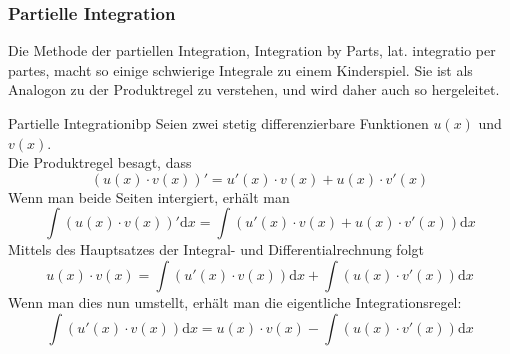 %
%
\subsubsection{Partielle Integration}
Die Methode der partiellen Integration, Integration by Parts, lat. integratio per partes, macht so einige schwierige Integrale zu einem Kinderspiel. Sie ist als Analogon zu der Produktregel zu verstehen, und wird daher auch so hergeleitet.
\begin{satz}{Partielle Integration}{ibp}
Seien zwei stetig differenzierbare Funktionen $u(x)$ und $v(x)$. \\
Die Produktregel besagt, dass
$$( u(x) \cdot v(x) )' = u'(x) \cdot v(x) + u(x) \cdot v'(x)$$ 
Wenn man beide Seiten intergiert, erhält man 
$$\int ( u(x) \cdot v(x) )' \mathrm{d}x = \int ( u'(x) \cdot v(x) + u(x) \cdot v'(x) ) \mathrm{d}x$$ 
Mittels des Hauptsatzes der Integral- und Differentialrechnung folgt
$$u(x) \cdot v(x) = \int ( u'(x) \cdot v(x) ) \mathrm{d}x + \int ( u(x) \cdot v'(x) ) \mathrm{d}x$$
Wenn man dies nun umstellt, erhält man die eigentliche Integrationsregel:
$$\int ( u'(x) \cdot v(x) ) \mathrm{d}x = u(x) \cdot v(x) - \int ( u(x) \cdot v'(x) ) \mathrm{d}x$$
\end{satz}

